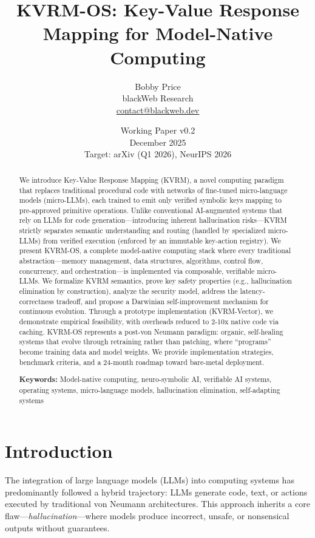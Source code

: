 \documentclass[11pt,a4paper]{article}
\title{KVRM-OS: Key-Value Response Mapping for Model-Native Computing}
\author{Bobby Price \\ blackWeb Research \\ \href{mailto:contact@blackweb.dev}{contact@blackweb.dev}}
\date{Working Paper v0.2 \\ December 2025 \\ Target: arXiv (Q1 2026), NeurIPS 2026}
\begin{document}
\maketitle

\begin{abstract}
We introduce Key-Value Response Mapping (KVRM), a novel computing paradigm that replaces traditional procedural code with networks of fine-tuned micro-language models (micro-LLMs), each trained to emit only verified symbolic keys mapping to pre-approved primitive operations. Unlike conventional AI-augmented systems that rely on LLMs for code generation---introducing inherent hallucination risks---KVRM strictly separates semantic understanding and routing (handled by specialized micro-LLMs) from verified execution (enforced by an immutable key-action registry). We present KVRM-OS, a complete model-native computing stack where every traditional abstraction---memory management, data structures, algorithms, control flow, concurrency, and orchestration---is implemented via composable, verifiable micro-LLMs. We formalize KVRM semantics, prove key safety properties (e.g., hallucination elimination by construction), analyze the security model, address the latency-correctness tradeoff, and propose a Darwinian self-improvement mechanism for continuous evolution. Through a prototype implementation (KVRM-Vector), we demonstrate empirical feasibility, with overheads reduced to 2-10x native code via caching. KVRM-OS represents a post-von Neumann paradigm: organic, self-healing systems that evolve through retraining rather than patching, where ``programs'' become training data and model weights. We provide implementation strategies, benchmark criteria, and a 24-month roadmap toward bare-metal deployment.

\vspace{0.5em}
\noindent\textbf{Keywords:} Model-native computing, neuro-symbolic AI, verifiable AI systems, operating systems, micro-language models, hallucination elimination, self-adapting systems
\end{abstract}

\tableofcontents
\newpage

\section{Introduction}

The integration of large language models (LLMs) into computing systems has predominantly followed a hybrid trajectory: LLMs generate code, text, or actions executed by traditional von Neumann architectures. This approach inherits a core flaw---\textit{hallucination}---where models produce incorrect, unsafe, or nonsensical outputs without guarantees.
\end{document}
